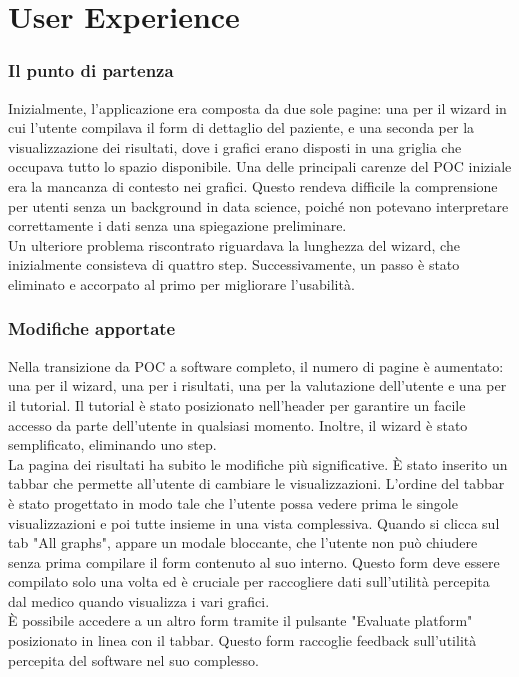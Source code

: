 \chapter{User Experience }
\label{cap:user-experience}

\subsection{Il punto di partenza}
Inizialmente, l'applicazione era composta da due sole pagine: una per il wizard in cui l'utente compilava il form di dettaglio del paziente, e una seconda per la visualizzazione dei risultati, dove i grafici erano disposti in una griglia che occupava tutto lo spazio disponibile. Una delle principali carenze del POC iniziale era la mancanza di contesto nei grafici. Questo rendeva difficile la comprensione per utenti senza un background in data science, poiché non potevano interpretare correttamente i dati senza una spiegazione preliminare.\\

Un ulteriore problema riscontrato riguardava la lunghezza del wizard, che inizialmente consisteva di quattro step. Successivamente, un passo è stato eliminato e accorpato al primo per migliorare l'usabilità.

\subsection{Modifiche apportate}

Nella transizione da POC a software completo, il numero di pagine è aumentato: una per il wizard, una per i risultati, una per la valutazione dell'utente e una per il tutorial. Il tutorial è stato posizionato nell'header per garantire un facile accesso da parte dell'utente in qualsiasi momento. Inoltre, il wizard è stato semplificato, eliminando uno step.\\

La pagina dei risultati ha subito le modifiche più significative. È stato inserito un tabbar che permette all'utente di cambiare le visualizzazioni. L'ordine del tabbar è stato progettato in modo tale che l'utente possa vedere prima le singole visualizzazioni e poi tutte insieme in una vista complessiva. Quando si clicca sul tab "All graphs", appare un modale bloccante, che l'utente non può chiudere senza prima compilare il form contenuto al suo interno. Questo form deve essere compilato solo una volta ed è cruciale per raccogliere dati sull'utilità percepita dal medico quando visualizza i vari grafici.\\
È possibile accedere a un altro form tramite il pulsante "Evaluate platform" posizionato in linea con il tabbar. Questo form raccoglie feedback sull'utilità percepita del software nel suo complesso.\\

